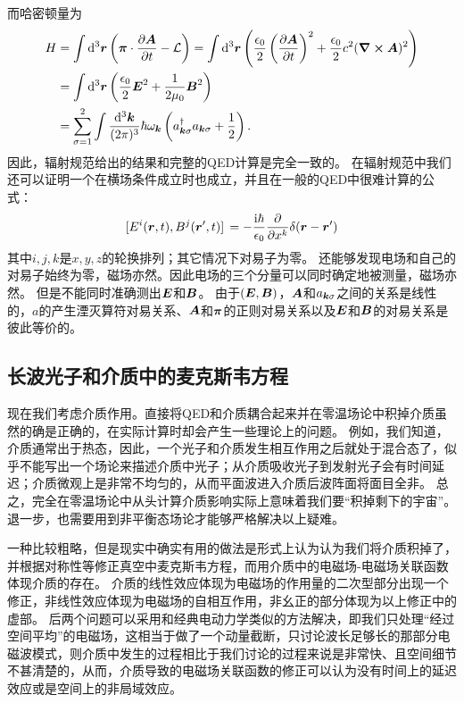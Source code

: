 而哈密顿量为
\begin{equation}
    \begin{aligned}
        H &= \int \dd[3]{\vb*{r}} \left(\vb*{\pi} \cdot \pdv{\vb*{A}}{t} - \mathcal{L} \right) = \int \dd[3]{\vb*{r}} \left( \frac{\epsilon_0}{2} \left(\pdv{\vb*{A}}{t}\right)^2 + \frac{\epsilon_0}{2} c^2 (\curl{\vb*{A}})^2 \right) \\
        &= \int \dd[3]{\vb*{r}} \left( \frac{\epsilon_0}{2} \vb*{E}^2 + \frac{1}{2\mu_0} \vb*{B}^2 \right) \\
        &= \sum_{\sigma=1}^2 \int \frac{\dd[3]{\vb*{k}}}{(2\pi)^3} \hbar \omega_{\vb*{k}} \left(a^\dagger_{\vb*{k} \sigma} a_{\vb*{k} \sigma} + \frac{1}{2} \right).
    \end{aligned}
\end{equation}
因此，辐射规范给出的结果和完整的QED计算是完全一致的。
在辐射规范中我们还可以证明一个在横场条件成立时也成立，并且在一般的QED中很难计算的公式：
\begin{equation}
    \comm*{E^i(\vb*{r}, t)}{B^j(\vb*{r}', t)} = - \frac{\ii \hbar}{\epsilon_0} \pdv{x^k} \delta(\vb*{r} - \vb*{r}')
\end{equation}
其中$i, j, k$是$x, y, z$的轮换排列；其它情况下对易子为零。
还能够发现电场和自己的对易子始终为零，磁场亦然。因此电场的三个分量可以同时确定地被测量，磁场亦然。
但是不能同时准确测出$\vb*{E}$和$\vb*{B}$。
由于$(\vb*{E}, \vb*{B})$，$\vb*{A}$和$a_{\vb*{k} \sigma}$之间的关系是线性的，$a$的产生湮灭算符对易关系、$\vb*{A}$和$\vb*{\pi}$的正则对易关系以及$\vb*{E}$和$\vb*{B}$的对易关系是彼此等价的。



\subsection{长波光子和介质中的麦克斯韦方程}\label{sec:long-wavelength-photon-maxwell-general}

现在我们考虑介质作用。直接将QED和介质耦合起来并在零温场论中积掉介质虽然的确是正确的，在实际计算时却会产生一些理论上的问题。
例如，我们知道，介质通常出于热态，因此，一个光子和介质发生相互作用之后就处于混合态了，似乎不能写出一个场论来描述介质中光子；从介质吸收光子到发射光子会有时间延迟；介质微观上是非常不均匀的，从而平面波进入介质后波阵面将面目全非。
总之，完全在零温场论中从头计算介质影响实际上意味着我们要“积掉剩下的宇宙”。
退一步，也需要用到非平衡态场论才能够严格解决以上疑难。

一种比较粗略，但是现实中确实有用的做法是形式上认为认为我们将介质积掉了，并根据对称性等修正真空中麦克斯韦方程，而用介质中的电磁场-电磁场关联函数体现介质的存在。
介质的线性效应体现为电磁场的作用量的二次型部分出现一个修正，非线性效应体现为电磁场的自相互作用，非幺正的部分体现为以上修正中的虚部。
后两个问题可以采用和经典电动力学类似的方法解决，即我们只处理“经过空间平均”的电磁场，这相当于做了一个动量截断，只讨论波长足够长的那部分电磁波模式，则介质中发生的过程相比于我们讨论的过程来说是非常快、且空间细节不甚清楚的，从而，介质导致的电磁场关联函数的修正可以认为没有时间上的延迟效应或是空间上的非局域效应。

